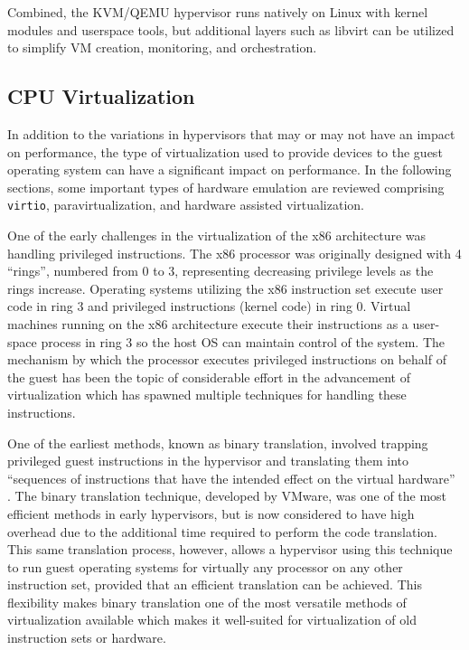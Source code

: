 Combined, the KVM/QEMU hypervisor runs natively on Linux with kernel modules and userspace tools, but additional layers such as libvirt \autocite{_libvirt_1} can be utilized to simplify VM creation, monitoring, and orchestration.


\subsection{CPU Virtualization}
\label{sec:vtcpu}
In addition to the variations in hypervisors that may or may not have an impact on performance, the type of virtualization used to provide devices to the guest operating system can have a significant impact on performance.
In the following sections, some important types of hardware emulation are reviewed comprising \texttt{virtio}, paravirtualization, and hardware assisted virtualization.

One of the early challenges in the virtualization of the x86 architecture was handling privileged instructions.
The x86 processor was originally designed with 4 ``rings'', numbered from 0 to 3, representing decreasing privilege levels as the rings increase.
Operating systems utilizing the x86 instruction set execute user code in ring 3 and privileged instructions (kernel code) in ring 0.
Virtual machines running on the x86 architecture execute their instructions as a user-space process in ring 3 so the host OS can maintain control of the system.
The mechanism by which the processor executes privileged instructions on behalf of the guest has been the topic of considerable effort in the advancement of virtualization which has spawned multiple techniques for handling these instructions.

One of the earliest methods, known as binary translation, involved trapping privileged guest instructions in the hypervisor and translating them into ``sequences of instructions that have the intended effect on the virtual hardware'' \autocite{vmwareVT}.
The binary translation technique, developed by VMware, was one of the most efficient methods in early hypervisors, but is now considered to have high overhead due to the additional time required to perform the code translation.
This same translation process, however, allows a hypervisor using this technique to run guest operating systems for virtually any processor on any other instruction set, provided that an efficient translation can be achieved.
This flexibility makes binary translation one of the most versatile methods of virtualization available which makes it well-suited for virtualization of old instruction sets or hardware.

